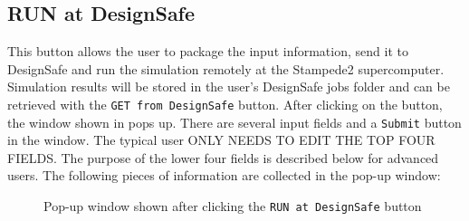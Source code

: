 \subsection{RUN at DesignSafe}
This button allows the user to package the input information, send it to DesignSafe and run the simulation remotely at the Stampede2 supercomputer. Simulation results will be stored in the user's DesignSafe jobs folder and can be retrieved with the \texttt{GET from DesignSafe} button. After clicking on the button, the window shown in  pops up. There are several input fields and a \texttt{Submit} button in the window. The typical user ONLY NEEDS TO EDIT THE TOP FOUR FIELDS. The purpose of the lower four fields is described below for advanced users. The following pieces of information are collected in the pop-up window:

\begin{figure}[!htbp]
  \caption{Pop-up window shown after clicking the \texttt{RUN at DesignSafe} button}
  \label{fig:remote_button}
\end{figure}

